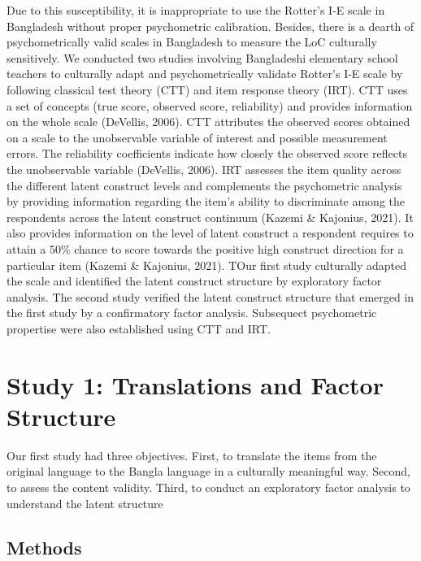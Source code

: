 \documentclass[
  english,
  man]{apa6}
\begin{document}
Due to this susceptibility, it is inappropriate to use the Rotter's I-E scale in Bangladesh without proper psychometric calibration. Besides, there is a dearth of psychometrically valid scales in Bangladesh to measure the LoC culturally sensitively. We conducted two studies involving Bangladeshi elementary school teachers to culturally adapt and psychometrically validate Rotter's I-E scale by following classical test theory (CTT) and item response theory (IRT). CTT uses a set of concepts (true score, observed score, reliability) and provides information on the whole scale (DeVellis, 2006). CTT attributes the observed scores obtained on a scale to the unobservable variable of interest and possible measurement errors. The reliability coefficients indicate how closely the observed score reflects the unobservable variable (DeVellis, 2006). IRT assesses the item quality across the different latent construct levels and complements the psychometric analysis by providing information regarding the item's ability to discriminate among the respondents across the latent construct continuum (Kazemi \& Kajonius, 2021). It also provides information on the level of latent construct a respondent requires to attain a 50\% chance to score towards the positive high construct direction for a particular item (Kazemi \& Kajonius, 2021). TOur first study culturally adapted the scale and identified the latent construct structure by exploratory factor analysis. The second study verified the latent construct structure that emerged in the first study by a confirmatory factor analysis. Subsequect psychometric propertise were also established using CTT and IRT.

\hypertarget{study-1-translations-and-factor-structure}{%
\section{Study 1: Translations and Factor Structure}\label{study-1-translations-and-factor-structure}}

Our first study had three objectives. First, to translate the items from the original language to the Bangla language in a culturally meaningful way. Second, to assess the content validity. Third, to conduct an exploratory factor analysis to understand the latent structure

\hypertarget{methods}{%
\subsection{Methods}\label{methods}}
\end{document}
